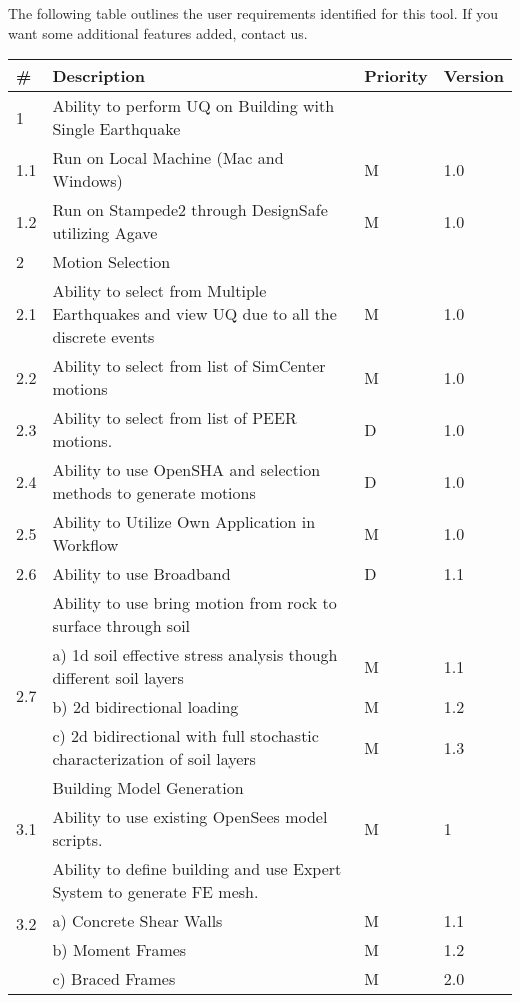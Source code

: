 The following table outlines the user requirements identified for this tool. If you want some additional features added, contact us.

\begin{table}[hbt!]                 
  \centering
\begin{adjustbox}{max width=\textwidth}            
  \begin{tabular}{llll}                    
    \toprule          
      \# & Description & Priority & Version \\ \hline
    
      1 & Ability to perform UQ on Building with Single Earthquake &  &  \\ \hline
	1.1 & Run on Local Machine (Mac and Windows) & M & 1.0 \\ \hline
	1.2 & Run on Stampede2 through DesignSafe utilizing Agave & M & 1.0 \\ \hline
	2 & Motion Selection &  &  \\ \hline
	2.1 & Ability to select from Multiple Earthquakes and view UQ due to all the discrete events & M & 1.0  \\ \hline
	2.2 & Ability to select from list of SimCenter motions & M & 1.0 \\ \hline
	2.3 & Ability to select from list of PEER motions. & D & 1.0 \\ \hline
	2.4 & Ability to use OpenSHA and selection methods to generate motions & D & 1.0 \\ \hline
	2.5 & Ability to Utilize Own Application in Workflow & M & 1.0 \\ \hline
	2.6 & Ability to use Broadband & D & 1.1 \\ \hline
	\multirow{5}{*}{2.7} 
	& Ability to use bring motion from rock to surface through soil &  &  \\ 
	 & a)     1d soil effective stress analysis though different soil layers & M & 1.1  \\ 
	 & b)     2d bidirectional loading & M & 1.2 \\ 
	 & c)     2d bidirectional with full stochastic characterization of soil layers & M & 1.3 \\ \hline

	3 & Building Model Generation &  &  \\ \hline
	3.1 & Ability to use existing OpenSees model scripts. & M & 1 \\ \hline
	\multirow{5}{*}{3.2}  & Ability to define building and use Expert System to generate FE mesh. &  &  \\
	 & a)     Concrete Shear Walls & M & 1.1 \\ 
	 & b)     Moment Frames & M & 1.2 \\ 
	 & c)     Braced Frames & M & 2.0  \\ \hline
	 

\end{tabular}
\end{adjustbox}
\end{table}
